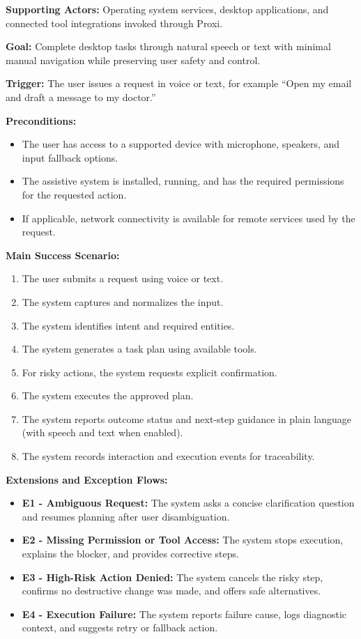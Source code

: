 \documentclass[12pt]{article}
\begin{document}
\noindent\textbf{Supporting Actors:}
Operating system services, desktop applications, and connected tool
integrations invoked through Proxi.

\noindent\textbf{Goal:}
Complete desktop tasks through natural speech or text with minimal
manual navigation while preserving user safety and control.

\noindent\textbf{Trigger:}
The user issues a request in voice or text, for example
``Open my email and draft a message to my doctor.''

\noindent\textbf{Preconditions:}
\begin{itemize}
  \item The user has access to a supported device with microphone,
  speakers, and input fallback options.
  \item The assistive system is installed, running, and has the
  required permissions for the requested action.
  \item If applicable, network connectivity is available for remote
  services used by the request.
\end{itemize}

\noindent\textbf{Main Success Scenario:}
\begin{enumerate}
  \item The user submits a request using voice or text.
  \item The system captures and normalizes the input.
  \item The system identifies intent and required entities.
  \item The system generates a task plan using available tools.
  \item For risky actions, the system requests explicit confirmation.
  \item The system executes the approved plan.
  \item The system reports outcome status and next-step guidance in
  plain language (with speech and text when enabled).
  \item The system records interaction and execution events for
  traceability.
\end{enumerate}

\noindent\textbf{Extensions and Exception Flows:}
\begin{itemize}
  \item \textbf{E1 - Ambiguous Request:} The system asks a concise
  clarification question and resumes planning after user disambiguation.
  \item \textbf{E2 - Missing Permission or Tool Access:} The system
  stops execution, explains the blocker, and provides corrective steps.
  \item \textbf{E3 - High-Risk Action Denied:} The system cancels the
  risky step, confirms no destructive change was made, and offers safe
  alternatives.
  \item \textbf{E4 - Execution Failure:} The system reports failure
  cause, logs diagnostic context, and suggests retry or fallback action.
\end{itemize}
\end{document}
